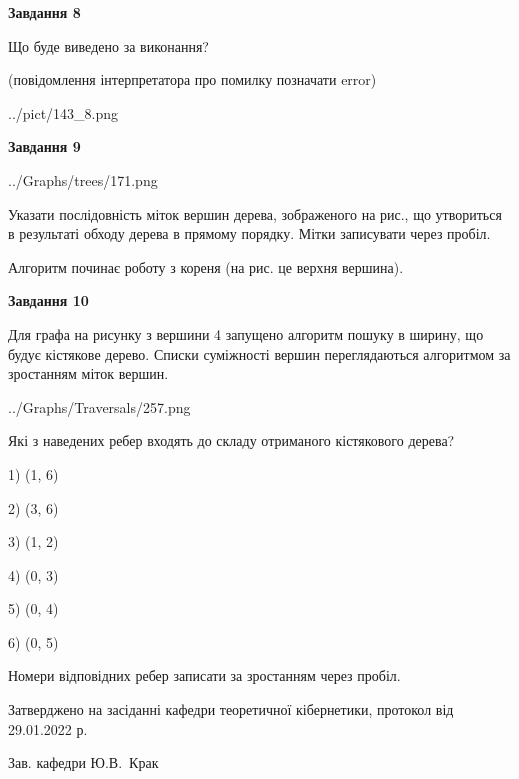 \documentclass[12pt, ukrainian]{article}
\begin{document}
{\begin {large}
{\begin {center}\textbf{Завдання 8}\end {center}}\par
Що буде виведено за виконання?\par
 (повідомлення інтерпретатора про помилку позначати error)\par
\begin{center}
	{../pict/143_8.png}
\end{center}
\newpage

{\begin {center}\textbf{Завдання 9}\end {center}}\par

\begin{center}
	{../Graphs/trees/171.png}
\end{center}
Указати послідовність міток вершин дерева, зображеного на рис., що утвориться в результаті обходу дерева в прямому порядку. Мітки записувати через пробіл.\par Алгоритм починає роботу з кореня (на рис. це верхня вершина).\par
\newpage

{\begin {center}\textbf{Завдання 10}\end {center}}\par
Для графа на рисунку з вершини 4 запущено алгоритм пошуку в ширину, що будує кістякове дерево. Списки суміжності вершин переглядаються алгоритмом за зростанням міток вершин.\par
\begin{center}
	{../Graphs/Traversals/257.png}
\end{center}
\par Які з наведених ребер входять до складу отриманого кістякового дерева?\par
1) (1, 6)\par
2) (3, 6)\par
3) (1, 2)\par
4) (0, 3)\par
5) (0, 4)\par
6) (0, 5)\par
{\vskip 15pt} Номери відповідних ребер записати за зростанням через пробіл.\par
\newpage


\end {large}
}
{\smallskip \begin {small} Затверджено на засіданні кафедри теоретичної кібернетики, протокол  від   29.01.2022 р.\par\smallskip\smallskip
{\parbox {6.5 cm}{Зав. кафедри \dotfill Ю.В.~Крак}} \end{small}}
\end{document}
